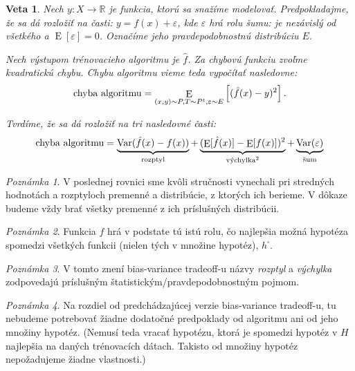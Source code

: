 \documentclass[a4paper,11pt]{article}
\theoremstyle{plain}
\newtheorem{theorem}{Veta}
\theoremstyle{remark}
\newtheorem{remark}{Poznámka}
\theoremstyle{definition}
\newcommand{\reals}{\mathbb{R}}
\DeclareMathOperator*{\E}{\mathrm{E}}
\DeclareMathOperator*{\Var}{\mathrm{Var}}
\newcommand{\chalg}{\text{\normalfont chyba algoritmu}}
\begin{document}
  \begin{theorem}
    Nech $y : X \to \reals$ je funkcia, ktorú sa snažíme modelovať.
    Predpokladajme, že sa dá rozložiť na časti: $y = f(x) + \varepsilon$,
    kde $\varepsilon$ hrá rolu šumu: je nezávislý od všetkého a
    $\E[\varepsilon] = 0$. Označíme jeho pravdepodobnostnú distribúciu
    $E$.
    
    Nech výstupom trénovacieho algoritmu je $\hat{f}$. Za chybovú
    funkciu zvoľme kvadratickú chybu. Chybu algoritmu vieme teda
    vypočítať nasledovne:
    $$\chalg = \E_{(x, y) \sim P, T \sim P^t, \varepsilon \sim E} \left[ (\hat{f}(x) - y)^2 \right].$$
    
    Tvrdíme, že sa dá rozložiť na tri nasledovné časti:
    $$
    \chalg
        = \underbrace{\Var(\hat{f}(x) - f(x))}_{\text{\normalfont rozptyl}}
        + \underbrace{(\E[\hat{f}(x)] - \E[f(x)])^2}_{\text{\normalfont výchylka}^2}
        + \underbrace{\Var(\varepsilon)}_{\text{\normalfont šum}}
    $$
  \end{theorem}
  \begin{remark}
    V poslednej rovnici sme kvôli stručnosti vynechali pri stredných
    hodnotách a rozptyloch premenné a distribúcie, z ktorých ich berieme.
    V dôkaze budeme vždy brať všetky premenné z ich príslušných distribúcii.
  \end{remark}
  \begin{remark}
    Funkcia $f$ hrá v podstate tú istú rolu, čo najlepšia možná hypotéza
    spomedzi všetkých funkcii (nielen tých v množine hypotéz), $h^\square$.
  \end{remark}
  \begin{remark}
    V tomto znení bias-variance tradeoff-u názvy \emph{rozptyl} a
    \emph{výchylka} zodpovedajú príslušným štatistickým/pravdepodobnostným
    pojmom.
  \end{remark}
  \begin{remark}
    Na rozdiel od predchádzajúcej verzie bias-variance tradeoff-u, tu
    nebudeme potrebovať žiadne dodatočné predpoklady od algoritmu ani
    od jeho množiny hypotéz. (Nemusí teda vracať hypotézu, ktorá je
    spomedzi hypotéz v $H$ najlepšia na daných trénovacích dátach.
    Takisto od množiny hypotéz nepožadujeme žiadne vlastnosti.)
  \end{remark}
\end{document}
